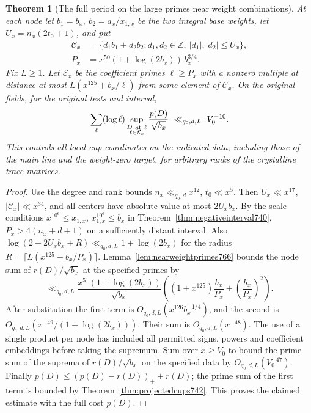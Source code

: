 \documentclass[a4paper,11pt]{article}
\newtheorem{theorem}[proposition]{Theorem}
\theoremstyle{definition}
\theoremstyle{remark}
\newcommand{\ZZ}{\mathbb Z}\newcommand{\ord}{\operatorname{ord}}
\numberwithin{equation}{section}
\begin{document}
\begin{theorem}[The full period on the large primes near weight combinations]
\leavevmode\label{thm:exceptionalperiod766}
At each node let \(b_1=b_x,\ b_2=a_x/x_{1,x}\) be the two
integral base weights, let \(U_x=n_x(2t_0+1)\), and put
\[
 \begin{aligned}
   \mathcal C_x&=\{d_1b_1+d_2b_2:
                d_1,d_2\in\ZZ,\ |d_1|,|d_2|\le U_x\},\\
   P_x&=x^{50}(1+\log(2b_x))\, b_x^{3/4}.
 \end{aligned}
\]
Fix \(L\ge1\). Let \(\mathcal E_x\) be the coefficient primes
\(\ell\ge P_x\) with a nonzero multiple at distance at most
\(L(x^{125}+b_x/\ell)\) from some element of \(\mathcal C_x\).
On the original fields, for the original tests and interval,
\[
      \sum_\ell(\log\ell)
         \sup_{\substack{D\ {\rm at}\ \ell\\\ell\in\mathcal E_x}}
         \frac{p(D)}{\sqrt{b_x}}\ \ll_{q_0,d,L}\ V_0^{-10}.
\]
This controls all local cup coordinates on the indicated
data, including those of the main line and the weight-zero
target, for arbitrary ranks of the crystalline trace matrices.
\end{theorem}
\begin{proof}
Use the degree and rank bounds \(n_x\ll_{q_0,d}x^{12}\),
\(t_0\ll x^5\). Then \(U_x\ll x^{17}\),
\(|\mathcal C_x|\ll x^{34}\), and all centers have absolute
value at most \(2U_x b_x\). By the scale conditions
\(x^{10^6}\le x_{1,x}\), \(x_{1,x}^{10^6}\le b_x\) in
Theorem~\ref{thm:negativeinterval740}, \(P_x>4(n_x+d+1)\)
on a sufficiently distant interval. Also
\(\log(2+2U_xb_x+R)\ll_{q_0,d,L}1+\log(2b_x)\) for the
radius \(R=\lceil L(x^{125}+b_x/P_x)\rceil\).
Lemma~\ref{lem:nearweightprimes766} bounds the node sum of
\(r(D)/\sqrt{b_x}\) at the specified primes by
\[
 \ll_{q_0,d,L}
 \frac{x^{51}(1+\log(2b_x))}{\sqrt{b_x}}
     \left((1+x^{125})\frac{b_x}{P_x}
                              +\left(\frac{b_x}{P_x}\right)^2\right).
\]
After substitution the first term is
\(O_{q_0,d,L}(x^{126} b_x^{-1/4})\), and the second is
\(O_{q_0,d,L}(x^{-49}/(1+\log(2b_x)))\).
Their sum is \(O_{q_0,d,L}(x^{-48})\).
The use of a single product per node has included all
permitted signs, powers and coefficient embeddings before
taking the supremum. Sum over \(x\ge V_0\) to bound the
prime sum of the suprema of \(r(D)/\sqrt{b_x}\) on the
specified data by \(O_{q_0,d,L}(V_0^{-47})\).
Finally \(p(D)\le (p(D)-r(D))_++r(D)\); the prime sum of
the first term is bounded by Theorem~\ref{thm:projectedcups742}.
This proves the claimed estimate with the full cost \(p(D)\).
\end{proof}
\end{document}
